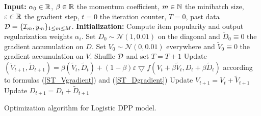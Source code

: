 \begin{algorithm}[t]
\begin{algorithmic}
\STATE \textbf{Input:} $\alpha_0 \in \mathbb{R}$, $\beta \in \mathbb{R}$ the momentum coefficient, $m \in \mathbb{N}$ the minibatch size, $\varepsilon \in \mathbb{R}$ the gradient step, $t=0$ the iteration counter, $T=0$, past data $\mathcal{D} = \{\mathcal{I}_m,y_m\}_{1 \leq m \leq M}$.
\STATE \textbf{Initialization:} Compute item popularity and output regularization weights $\alpha_i$. 
\STATE Set $D_0 \sim \mathcal{N}(1,0.01)$ on the diagonal and $\tilde{D}_0 \equiv 0$ the gradient accumulation on $D$.
\STATE Set $V_0 \sim \mathcal{N}(0,0.01)$ everywhere and $\tilde{V}_0 \equiv 0$ the gradient accumulation on $V$.
\STATE Shuffle $\mathcal{D}$ and set $T = T +1 $
\ENDIF 
\STATE Update $(\tilde{V}_{t+1}, \tilde{D}_{t+1}) = \beta (\tilde{V}_t,\tilde{D}_t) + (1-\beta) \varepsilon \bigtriangledown f(V_t+\beta \tilde{V}_t, D_t+\beta \tilde{D}_t)$ according to formulas (\ref{ST_Vgradient}) and (\ref{ST_Dgradient})
\STATE Update $V_{t+1} = V_t + \tilde{V}_{t+1}$
\STATE Update $D_{t+1} = D_t + \tilde{D}_{t+1}$ 
\ENDWHILE
\end{algorithmic}
\caption{Optimization algorithm for Logistic DPP model.}
\label{alg:singletask}
\end{algorithm}

